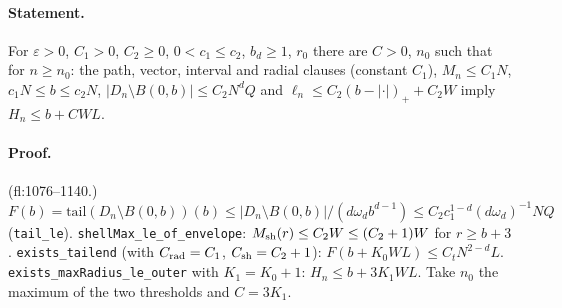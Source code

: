 \paragraph{Statement.} For $\varepsilon>0$, $C_1>0$, $C_2\geq0$, $0<c_1\leq c_2$, $b_d\geq1$, $r_0$ there are $C>0$, $n_0$ such that for $n\geq n_0$: the path, vector,
interval and radial clauses (constant $C_1$), $M_n\leq C_1N$, $c_1N\leq b\leq c_2N$, $|D_n\setminus B(0,b)|\leq C_2N^dQ$ and $\ell_n\leq C_2(b-|\cdot|)_++C_2W$
imply $H_n\leq b+CWL$.
\paragraph{Proof.} (fl:1076--1140.) $F(b)=\mathrm{tail}(D_n\setminus B(0,b))(b)\leq|D_n\setminus B(0,b)|/(d\omega_db^{d-1})\leq C_2c_1^{1-d}(d\omega_d)^{-1}NQ$ (\texttt{tail\_le}).
\texttt{shellMax\_le\_of\_envelope}: $M_{\rm sh}(r)\leq C_2W\leq(C_2+1)W$ for $r\geq b+3$. \texttt{exists\_tailend} (with $C_{\rm rad}=C_1$, $C_{\rm sh}=C_2+1$):
$F(b+K_0WL)\leq C_tN^{2-d}L$. \texttt{exists\_maxRadius\_le\_outer} with $K_1=K_0+1$: $H_n\leq b+3K_1WL$. Take $n_0$ the maximum of the two thresholds and $C=3K_1$.
